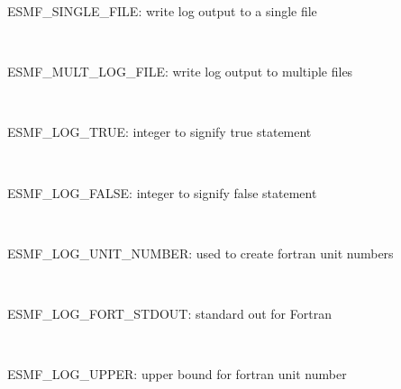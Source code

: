  
\setlength{\parskip}{0pt}
\setlength{\parindent}{0pt}
\setlength{\baselineskip}{11pt}
 
\def\bv{\begin{verbatim}}
\def\ev{\end{verbatim}}
\def\be{\begin{equation}}
\def\ee{\end{equation}}
\def\bea{\begin{eqnarray}}
\def\eea{\end{eqnarray}}
\def\bi{\begin{itemize}}
\def\ei{\end{itemize}}
\def\bn{\begin{enumerate}}
\def\en{\end{enumerate}}
\def\bd{\begin{description}}
\def\ed{\end{description}}
\def\({\left (}
\def\){\right )}
\def\[{\left [}
\def\]{\right ]}
\def\<{\left  \langle}
\def\>{\right \rangle}
\def\cI{{\cal I}}
\def\diag{\mathop{\rm diag}}
\def\tr{\mathop{\rm tr}}


 

 ESMF\_SINGLE\_FILE: write log output to a single file 
 
\mbox{}\hrulefill\ 
 

 ESMF\_MULT\_LOG\_FILE: write log output to multiple files 
 
\mbox{}\hrulefill\ 
 

 ESMF\_LOG\_TRUE: integer to signify true statement 
 
\mbox{}\hrulefill\ 
 

 ESMF\_LOG\_FALSE: integer to signify false statement 
 
\mbox{}\hrulefill\ 
 

 ESMF\_LOG\_UNIT\_NUMBER: used to create fortran unit numbers 
 
\mbox{}\hrulefill\ 
 

 ESMF\_LOG\_FORT\_STDOUT: standard out for Fortran 
 
\mbox{}\hrulefill\ 
 

 ESMF\_LOG\_UPPER: upper bound for fortran unit number
